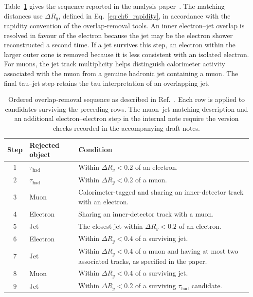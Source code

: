 Table~\ref{tab:ch6_overlap} gives the sequence reported in the analysis paper~\cite{ATLAS2026LQTauNu}.
The matching distances use $\Delta R_y$, defined in Eq.~\eqref{eq:ch6_rapidity}, in accordance with the rapidity convention of the overlap-removal tools.
An inner electron--jet overlap is resolved in favour of the electron because the jet may be the electron shower reconstructed a second time.
If a jet survives this step, an electron within the larger outer cone is removed because it is less consistent with an isolated electron.
For muons, the jet track multiplicity helps distinguish calorimeter activity associated with the muon from a genuine hadronic jet containing a muon.
The final tau--jet step retains the tau interpretation of an overlapping jet.

\begin{table}[htbp]
    \centering
    \small
    \caption{Ordered overlap-removal sequence as described in Ref.~\cite{ATLAS2026LQTauNu}. Each row is applied to candidates surviving the preceding rows. The muon--jet matching description and an additional electron--electron step in the internal note require the version checks recorded in the accompanying draft notes.}
    \label{tab:ch6_overlap}
    \renewcommand{\arraystretch}{1.16}
    \begin{tabular}{clp{8.1cm}}
        \toprule
        Step & Rejected object & Condition \\
        \midrule
        1 & $\tau_{\mathrm{had}}$ & Within $\Delta R_y<0.2$ of an electron. \\
        2 & $\tau_{\mathrm{had}}$ & Within $\Delta R_y<0.2$ of a muon. \\
        3 & Muon & Calorimeter-tagged and sharing an inner-detector track with an electron. \\
        4 & Electron & Sharing an inner-detector track with a muon. \\
        5 & Jet & The closest jet within $\Delta R_y<0.2$ of an electron. \\
        6 & Electron & Within $\Delta R_y<0.4$ of a surviving jet. \\
        7 & Jet & Within $\Delta R_y<0.4$ of a muon and having at most two associated tracks, as specified in the paper. \\
        8 & Muon & Within $\Delta R_y<0.4$ of a surviving jet. \\
        9 & Jet & Within $\Delta R_y<0.2$ of a surviving $\tau_{\mathrm{had}}$ candidate. \\
        \bottomrule
    \end{tabular}
\end{table}

